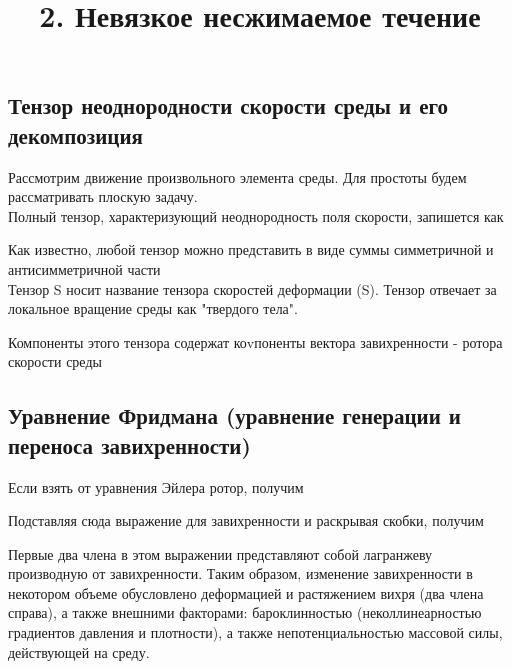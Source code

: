 \documentclass[
]{article}
\title{2. Невязкое несжимаемое течение}
\author{}
\date{}
\begin{document}
\maketitle

\subsection{Тензор неоднородности скорости среды и его
декомпозиция}\label{ux442ux435ux43dux437ux43eux440-ux43dux435ux43eux434ux43dux43eux440ux43eux434ux43dux43eux441ux442ux438-ux441ux43aux43eux440ux43eux441ux442ux438-ux441ux440ux435ux434ux44b-ux438-ux435ux433ux43e-ux434ux435ux43aux43eux43cux43fux43eux437ux438ux446ux438ux44f}

Рассмотрим движение произвольного элемента среды. Для простоты будем
рассматривать плоскую задачу.\\
Полный тензор, характеризующий неоднородность поля скорости, запишется
как

Как известно, любой тензор можно представить в виде суммы симметричной и
антисимметричной части\\
{} Тензор S носит название тензора скоростей деформации (S). Тензор {}
отвечает за локальное вращение среды как "твердого тела".

Компоненты этого тензора содержат коvпоненты вектора завихренности -
ротора скорости среды

\subsection{Уравнение Фридмана (уравнение генерации и переноса
завихренности)}\label{ux443ux440ux430ux432ux43dux435ux43dux438ux435-ux444ux440ux438ux434ux43cux430ux43dux430-ux443ux440ux430ux432ux43dux435ux43dux438ux435-ux433ux435ux43dux435ux440ux430ux446ux438ux438-ux438-ux43fux435ux440ux435ux43dux43eux441ux430-ux437ux430ux432ux438ux445ux440ux435ux43dux43dux43eux441ux442ux438}

Если взять от уравнения Эйлера ротор, получим\\
{}

Подставляя сюда выражение для завихренности и раскрывая скобки,
получим\\
{}

Первые два члена в этом выражении представляют собой лагранжеву
производную от завихренности. Таким образом, изменение завихренности в
некотором объеме обусловлено деформацией и растяжением вихря (два члена
справа), а также внешними факторами: бароклинностью (неколлинеарностью
градиентов давления и плотности), а также непотенциальностью массовой
силы, действующей на среду.
\end{document}
